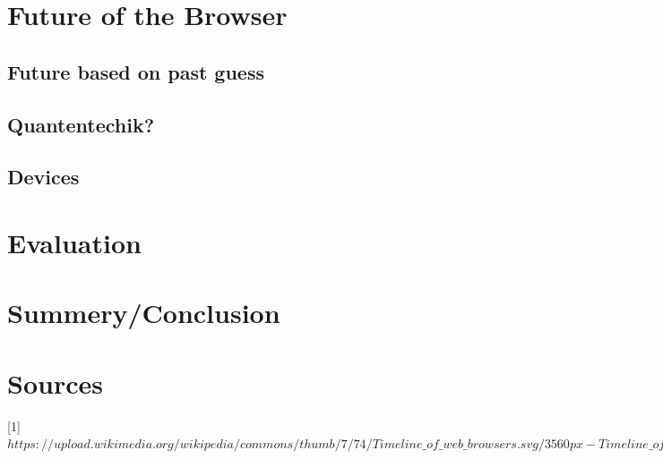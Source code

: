 \documentclass[runningheads]{llncs}
\begin{document}
	\section{Future of the Browser}
		\subsection{Future based on past guess}
		\subsection{Quantentechik?}
		\subsection{Devices}

	\section{Evaluation}

	\section{Summery/Conclusion}
	\section{Sources}
	[1] $https://upload.wikimedia.org/wikipedia/commons/thumb/7/74/Timeline\_of\_web\_browsers.svg/3560px-Timeline\_of\_web\_browsers.svg.png$
\end{document}
